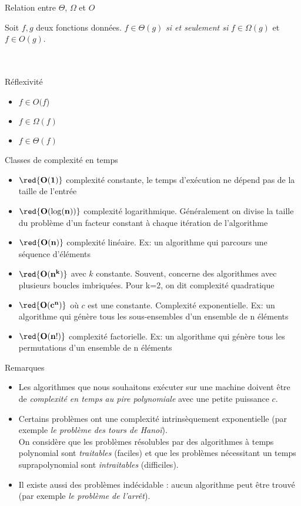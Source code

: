 \begin{frame}{Relation entre $\Theta$, $\Omega$ et $O$}

  \begin{theorem}
    Soit $f,g$ deux fonctions données. $f \in \Theta(g)$ \emph{si et
      seulement si} $f \in \Omega(g)$ et $f \in O(g)$. 
  \end{theorem}
~\\~\\
Réflexivité 
\begin{itemize}
\item $f \in O(f$)
\item $f \in \Omega(f)$
\item $f \in \Theta(f)$
\end{itemize}
\end{frame}

\begin{frame}{Classes de complexité en temps}
  \begin{itemize}
  \item  $\red{\mathbf{O(1)}}$ complexité constante, le temps
    d’exécution ne dépend pas de la taille  de l’entrée
  \item $ \red{\mathbf{O(\log(n))}}$ complexité logarithmique.
    Généralement on divise la taille du problème d’un facteur constant
    à chaque itération de l’algorithme
  \item $\red{\mathbf{O(n)}}$ complexité linéaire. Ex: un algorithme
    qui parcours une séquence d’éléments
  \item $\red{\mathbf{ O(n^k)}}$ avec $k$ constante. Souvent, concerne
    des algorithmes avec plusieurs boucles imbriquées. Pour k=2, on
    dit complexité quadratique
  \item $\red{\mathbf{O(c^n)}}$ où $c$ est une constante. Complexité
      exponentielle. Ex:  un algorithme qui génère tous les
      sous-ensembles d’un ensemble de n éléments
    \item $\red{\mathbf{O(n!)}}$ complexité factorielle. Ex:  un
      algorithme qui génère tous les permutations d’un ensemble de n
      éléments 
  \end{itemize}
\end{frame}

\begin{frame}{Remarques}
  \begin{itemize}
  \item  Les algorithmes que nous souhaitons exécuter sur une machine
    doivent être de \emph{complexité en temps au pire polynomiale} avec une
    petite puissance $c$.
  \item Certains problèmes ont une complexité intrinsèquement
    exponentielle (par exemple \emph{le problème des tours de Hanoï}). \\
    On considère que les problèmes résolubles par des algorithmes à temps polynomial sont \emph{traitables} (faciles) et  que les problèmes nécessitant un temps suprapolynomial sont  \emph{intraitables} (difficiles).
    \item Il existe aussi des problèmes indécidable : aucun algorithme peut être trouvé (par exemple \emph{le problème de l'arrêt}).
  \end{itemize}
\end{frame}

